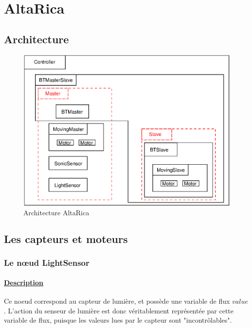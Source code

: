  \section{AltaRica}

  \subsection{Architecture}
  \begin{figure}[!ht]
   \begin{center}
    \includegraphics{ARmodel.eps}
    \caption{Architecture AltaRica}
   \end{center}
  \end{figure}

  \subsection{Les capteurs et moteurs}
    
   \subsubsection{Le n\oe{}ud LightSensor}

    \paragraph{\underline{Description\\}}
    Ce noeud correspond au capteur de lumière, et possède une variable 
    de flux $value$. L'action du senseur de lumière est donc véritablement 
    représentée par cette variable de flux, puisque les valeurs lues par
     le capteur sont "incontrôlables".

